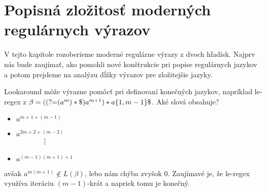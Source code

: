 \section[Popisná zložitosť]{Popisná zložitosť moderných regulárnych výrazov}
\label{vzlozitost}

V tejto kapitole rozoberieme moderné regulárne výrazy z dvoch hľadísk. Najprv nás bude zaujímať, ako pomohli nové konštrukcie pri popise regulárnych jazykov a potom prejdeme na analýzu dĺžky výrazov pre zložitejšie jazyky.

Lookaround môže výrazne pomôcť pri definovaní konečných jazykov, napríklad le-regex z \cite[Poznámka 1.]{mojaBak}
$\beta = (\text{(?=} (a^m)*\mathdollar )a^{m+1})*a \lbrace 1,m-1 \rbrace \mathdollar$. Aké slová obsahuje?
\begin{itemize}
\item $a^{m+1+(m-1)}$
\item $a^{2m+2+(m-2)}$ \\
	  ~~~~~~~\vdots
\item $a^{(m-1)(m+1)+1}$
\end{itemize}
avšak $a^{m(m+1)} \notin L(\beta )$, lebo nám chýba zvyšok $0$. Zaujímavé je, že le-regex využíva iteráciu $(m-1)$-krát a napriek tomu je konečný.
